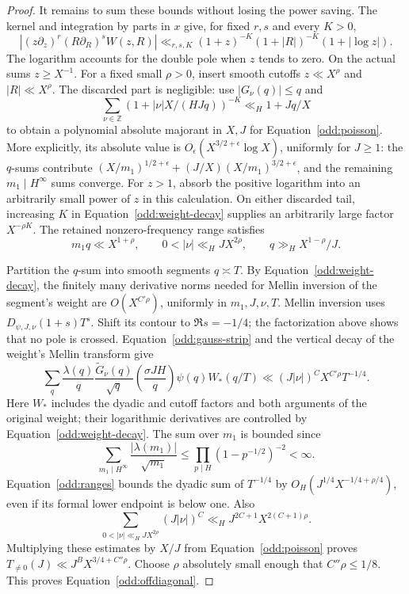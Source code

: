 \begin{proof}
It remains to sum these bounds without losing the power saving.
The kernel and integration by parts in $x$ give, for fixed $r,s$ and
every $K>0$,
\begin{equation}\label{odd:weight-decay}
 |(z\partial_z)^r(R\partial_R)^s W(z,R)|
 \ll_{r,s,K}(1+z)^{-K}(1+|R|)^{-K}(1+|\log z|).
\end{equation}
The logarithm accounts for the double pole when $z$ tends to zero.
On the actual sums $z\ge X^{-1}$.
For a fixed small $\rho>0$, insert smooth cutoffs
$z\ll X^\rho$ and $|R|\ll X^\rho$.
The discarded part is negligible: use $|G_\nu(q)|\le q$ and
\[
 \sum_{\nu\in\mathbb Z}
 (1+|\nu|X/(HJq))^{-K}\ll_H1+Jq/X
\]
to obtain a polynomial absolute majorant in $X,J$ for
Equation~\eqref{odd:poisson}.  More explicitly, its absolute value is
$O_\epsilon(X^{3/2+\epsilon}\log X)$, uniformly for $J\ge1$:
the $q$-sums contribute
$(X/m_1)^{1/2+\epsilon}+(J/X)(X/m_1)^{3/2+\epsilon}$,
and the remaining $m_1\mid H^\infty$ sums converge.
For $z>1$, absorb the positive logarithm into an arbitrarily small
power of $z$ in this calculation.  On either discarded tail, increasing
$K$ in Equation~\eqref{odd:weight-decay} supplies an arbitrarily large
factor $X^{-\rho K}$.
The retained nonzero-frequency range satisfies
\begin{equation}\label{odd:ranges}
 m_1q\ll X^{1+\rho},\qquad
 0<|\nu|\ll_H JX^{2\rho},\qquad
 q\gg_H X^{1-\rho}/J.
\end{equation}

Partition the $q$-sum into smooth segments $q\asymp T$.
By Equation~\eqref{odd:weight-decay}, the finitely many derivative
norms needed for Mellin inversion of the segment's weight are
$O(X^{C'\rho})$, uniformly in $m_1,J,\nu,T$.
Mellin inversion uses $D_{\psi,J,\nu}(1+s)T^s$.
Shift its contour to $\Re s=-1/4$; the factorization above shows that
no pole is crossed.  Equation~\eqref{odd:gauss-strip} and the vertical
decay of the weight's Mellin transform give
\begin{equation}\label{odd:dyadic}
 \sum_q\frac{\lambda(q)}q\frac{\widetilde G_\nu(q)}{\sqrt q}
 \left(\frac{\sigma JH}{q}\right)\psi(q)W_*(q/T)
 \ll (J|\nu|)^C X^{C'\rho}T^{-1/4}.
\end{equation}
Here $W_*$ includes the dyadic and cutoff factors and both arguments
of the original weight; their logarithmic derivatives are controlled
by Equation~\eqref{odd:weight-decay}.
The sum over $m_1$ is bounded since
\[
 \sum_{m_1\mid H^\infty}\frac{|\lambda(m_1)|}{\sqrt{m_1}}
 \le\prod_{p\mid H}(1-p^{-1/2})^{-2}<\infty.
\]
Equation~\eqref{odd:ranges} bounds the dyadic sum of $T^{-1/4}$ by
$O_H(J^{1/4}X^{-1/4+\rho/4})$, even if its formal lower endpoint
is below one.  Also
\[
 \sum_{0<|\nu|\ll_H JX^{2\rho}}(J|\nu|)^C
 \ll_H J^{2C+1}X^{2(C+1)\rho}.
\]
Multiplying these estimates by $X/J$ from Equation~\eqref{odd:poisson}
proves $T_{\ne0}(J)\ll J^B X^{3/4+C''\rho}$.
Choose $\rho$ absolutely small enough that $C''\rho\le1/8$.
This proves Equation~\eqref{odd:offdiagonal}.


\end{proof}
